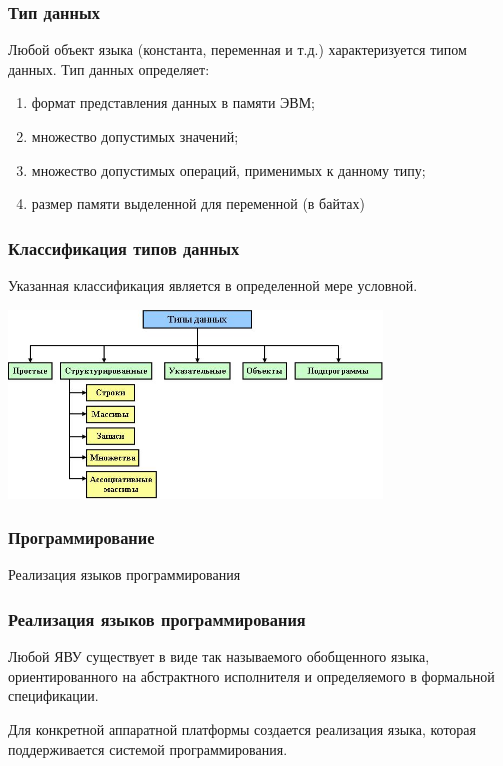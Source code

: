 	\begin{frame}
\frametitle{Тип данных}


Любой объект языка (константа, переменная и т.д.) характеризуется типом данных. Тип данных определяет:

\begin{enumerate}
	\item формат представления данных в памяти ЭВМ;
	\item множество допустимых значений;
	\item множество допустимых операций, применимых к данному типу;
	\item размер памяти выделенной для переменной (в байтах)
\end{enumerate}

\end{frame}

	\begin{frame}
\frametitle{Классификация типов данных}
Указанная классификация является в определенной мере условной.

\includegraphics[height=5cm]{images/td.png}
\end{frame}

\begin{frame}
\frametitle{Программирование}

\begin{center}

\Huge
Реализация языков программирования
	
\end{center}
\end{frame}

	\begin{frame}
\frametitle{Реализация языков программирования}


Любой ЯВУ существует в виде так называемого обобщенного языка, ориентированного на абстрактного исполнителя и определяемого в формальной спецификации. 

Для конкретной аппаратной платформы создается реализация языка, которая поддерживается системой программирования.

\end{frame}

